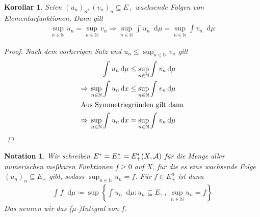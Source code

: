 \documentclass[11pt, twoside, a4paper]{article}
\theoremstyle{plain}
\newtheorem{notation}[blockelement]{Notation}
\newtheorem{korollar}[blockelement]{Korollar}
\numberwithin{equation}{subsection}
\newcommand{\set}[1]{\left\{#1\right\}}
\newcommand{\of}[1]{\mathopen{}\mathclose{}\bgroup\left(#1\aftergroup\egroup\right)}
\newcommand{\impl}[0]{\Rightarrow{}}
\newcommand{\dif}{\mathop{}\!\mathrm{d}}
\newcommand{\N}{\mathbb{N}}
\newcommand{\mA}{\mathcal{A}}
\begin{document}
    \begin{korollar}
        Seien $(u_n)_n, (v_n)_n \subseteq E_+$ wachsende Folgen von Elementarfunktionen. Dann gilt
        \begin{align*}
            \sup_{n\in\N} u_n = \sup_{n\in\N} v_n \impl \sup_{n\in\N} \int_{}^{} u_n \dif \mu = \sup_{n\in\N} \int_{}^{} v_n \dif \mu
        \end{align*}

        \begin{proof}
            Nach dem vorherigen Satz und $u_n \leq \sup_{n\in\N} v_n$ gilt
            \begin{align*}
                \int_{}^{} u_n \dif \mu &\leq \sup_{n\in\N} \int_{}^{} v_n \dif \mu\\
                \impl \sup_{n\in\N} \int_{}^{} u_n \dif x &\leq \sup_{n\in\N} \int_{}^{} v_n \dif \mu\\
                \intertext{Aus Symmetriegründen gilt dann}
                \impl \sup_{n\in\N} \int_{}^{} u_n \dif x &= \sup_{n\in\N} \int_{}^{} v_n \dif \mu
            \end{align*}
        \end{proof}
    \end{korollar}

    \begin{notation}
        Wir schreiben $E^{\ast} = E^{\ast}_+ = E^{\ast}_+\of{X, \mA}$ für die Menge aller numerischen meßbaren Funktionen $f\geq 0$ auf $X$, für die es eine wachsende Folge $(u_n)_n \subseteq E_+$ gibt, sodass $\sup_{n\in\N} u_n = f$. Für $f\in E_+^n$ ist dann
        \begin{align*}
            \int_{}^{} f \dif \mu \coloneqq \sup\set{\int_{}^{} u_n \dif \mu: u_n \subseteq E_+,~\sup_{n\in\N} u_n = f}
        \end{align*}
        Das nennen wir das ($\mu$-)Integral von $f$.
    \end{notation}
\end{document}
